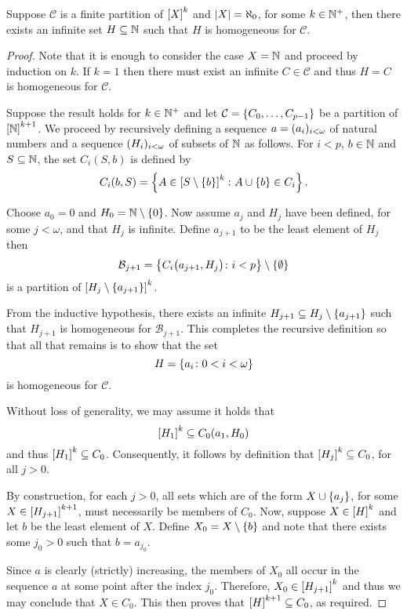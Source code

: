 \begin{thm}
	Suppose $\mathcal{C}$ is a finite partition of $\subsets{k}{X}$ and
	$\card{X}=\aleph_0$, for some $k\in\posnats$, then there exists an infinite
	set $H\subseteq\nats$ such that $H$ is homogeneous for $\mathcal{C}$.
\end{thm}
\begin{proof}
	Note that it is enough to consider the case $X=\nats$ and proceed by
	induction on $k$. If $k=1$ then there must exist an infinite
	$C\in\mathcal{C}$ and thus $H=C$ is homogeneous for $\mathcal{C}$.

	Suppose the result holds for $k\in\posnats$ and let
	$\mathcal{C}=\set{C_0,\dotsc,C_{p-1}}$ be a partition of
	$\subsets{k+1}{\nats}$.  We proceed by recursively defining a sequence
	$a=\family{a_i}{i<\omega}$ of natural numbers and a sequence
	$\family{H_i}{i<\omega}$ of subsets of $\nats$ as follows.  For $i<p$,
	$b\in\nats$ and $S\subseteq\nats$, the set $C_i(S,b)$ is defined by
	\begin{equation}
		C_i(b,S)=\setbuild{A\in\subsets{k}{S\setminus\set{b}}}{A\cup\set{b}\in
			C_i}.
	\end{equation}

	Choose $a_0=0$ and $H_0=\nats\setminus\set{0}$.  Now assume $a_j$ and $H_j$
	have been defined, for some $j<\omega$, and that $H_j$ is infinite.  Define
	$a_{j+1}$ to be the least element of $H_j$ then
	\begin{equation}
		\mathcal{B}_{j+1}=\setbuild{C_i\big(a_{j+1},H_j\big)}{
			i<p}\setminus\set{\emptyset}
	\end{equation}
	is a partition of $\subsets{k}{H_j\setminus\set{a_{j+1}}}$.

	From the inductive hypothesis, there exists an infinite $H_{j+1}\subseteq
		H_j\setminus\set{a_{j+1}}$ such that $H_{j+1}$ is homogeneous for
	$\mathcal{B}_{j+1}$.  This completes the recursive definition so that all that
	remains is to show that the set
	\begin{equation}
		H=\setbuild{a_i}{0<i<\omega}
	\end{equation}
	is homogeneous for $\mathcal{C}$.

	Without loss of generality, we may assume it holds that
	\begin{equation}
		\subsets{k}{H_1}\subseteq C_0(a_1,H_0)
	\end{equation}
	and thus $\subsets{k}{H_1}\subseteq C_0$.  Consequently, it follows by
	definition that $\subsets{k}{H_j}\subseteq C_0$, for all $j>0$.

	By construction, for each $j>0$, all sets which are of the form
	$X\cup\set{a_j}$, for some $X\in\subsets{k+1}{H_{j+1}}$, must necessarily be
	members of $C_0$.  Now, suppose $X\in\subsets{k}{H}$ and let $b$ be the
	least element of $X$.  Define $X_0=X\setminus\set{b}$ and note that there
	exists some $j_0>0$ such that $b=a_{j_0}$.

	Since $a$ is clearly (strictly) increasing, the members of $X_0$ all occur
	in the sequence $a$ at some point after the index $j_0$. Therefore,
	$X_0\in\subsets{k}{H_{j+1}}$ and thus we may conclude that $X\in C_0$.  This
	then proves that $\subsets{k+1}{H}\subseteq C_0$, as required.
\end{proof}

